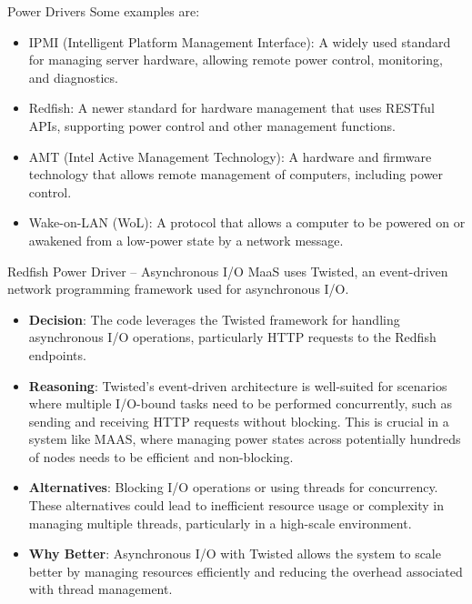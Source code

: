 \documentclass{beamer}
\begin{document}
    \begin{frame}{Power Drivers}
        Some examples are:
        \begin{itemize}
            \item IPMI (Intelligent Platform Management Interface): A widely used standard for managing server hardware, allowing remote power control, monitoring, and diagnostics.
            \item Redfish: A newer standard for hardware management that uses RESTful APIs, supporting power control and other management functions.
            \item AMT (Intel Active Management Technology): A hardware and firmware technology that allows remote management of computers, including power control.
            \item Wake-on-LAN (WoL): A protocol that allows a computer to be powered on or awakened from a low-power state by a network message.
        \end{itemize}
    \end{frame}


    \begin{frame}{Redfish Power Driver -- Asynchronous I/O}
        MaaS uses Twisted, an event-driven network programming framework used for asynchronous I/O.
        \scriptsize
        \begin{itemize}
            \item \textbf{Decision}: The code leverages the Twisted framework for handling asynchronous I/O operations, particularly HTTP requests to the Redfish endpoints.
            \item \textbf{Reasoning}: Twisted's event-driven architecture is well-suited for scenarios where multiple I/O-bound tasks need to be performed concurrently, such as sending and receiving HTTP requests without blocking. This is crucial in a system like MAAS, where managing power states across potentially hundreds of nodes needs to be efficient and non-blocking.
            \item \textbf{Alternatives}: Blocking I/O operations or using threads for concurrency. These alternatives could lead to inefficient resource usage or complexity in managing multiple threads, particularly in a high-scale environment.
            \item \textbf{Why Better}: Asynchronous I/O with Twisted allows the system to scale better by managing resources efficiently and reducing the overhead associated with thread management.
        \end{itemize}
    \end{frame}
\end{document}
